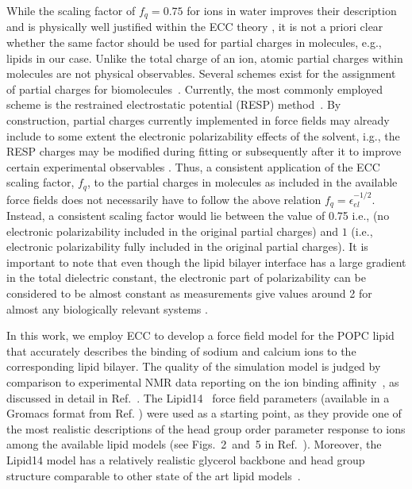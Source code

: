 \documentclass[aip,jcp,twocolumn]{revtex4}
\begin{document}
While the scaling factor of $f_q = 0.75$ for ions in water improves their description and is physically well justified within the ECC theory \cite{Leontyev2011},
it is not a priori  clear whether the same factor should be used for partial charges in molecules,
e.g., lipids in our case. Unlike the total charge of an ion, atomic partial charges within molecules are not physical observables.
Several schemes exist for the assignment of partial charges for biomolecules~\cite{Hu2007}.
Currently, the most commonly employed scheme is the restrained electrostatic potential (RESP) method~\cite{RESP_paper,Singh1984}.
By construction, partial charges currently implemented in force fields may already 
include  to some extent the electronic polarizability effects of the solvent, i.g.,
the RESP charges may be modified during fitting or subsequently after it 
to improve certain experimental observables 
\cite{RESP_paper,Singh1984,jorgensen96,ipolq2013,benavides17}. 
Thus, a consistent application of the ECC scaling factor, $f_q$, to the partial charges in molecules as
included in the available force fields does not necessarily have to follow the above relation $f_q = \epsilon _{el} ^{-1/2}$. 
Instead, a consistent scaling factor would lie between the value of 0.75 i.e., (no electronic polarizability included in the original partial charges)
and $1$ (i.e., electronic polarizability fully included in the original partial charges).
It is important to note that even though the lipid bilayer interface has a large gradient in
the total dielectric constant, the electronic part of polarizability can be considered to be almost constant
as measurements give values around 2 
for almost any biologically relevant systems \cite{some_original_work, leontyev11}.


In this work, we employ ECC to develop a force field model for
the POPC lipid that accurately describes the binding of sodium and calcium ions to the corresponding lipid bilayer.
The quality of the simulation model is judged by comparison 
to experimental NMR data reporting on the ion binding
affinity~\cite{akutsu81,altenbach84,scherer89}, 
as discussed in detail in Ref.~.
The Lipid14~\cite{dickson14} force field parameters (available in a Gromacs format from Ref. )
were used as a starting point, as they provide one of the most
realistic descriptions of the head group order parameter response to ions 
among the available lipid models (see Figs.~2~and~5 in Ref.~).
Moreover, the Lipid14 model has a relatively realistic glycerol backbone and
head group structure comparable to other state of the art lipid models~\cite{botan15}.
\end{document}
